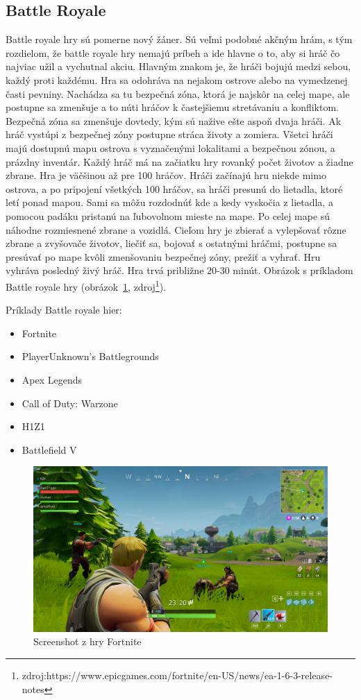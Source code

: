 \documentclass[10pt,oneside,slovak,a4paper]{article}
\begin{document}
\subsection{Battle Royale} \label{zanre:battleroyale}

Battle royale hry sú pomerne nový žáner. Sú veľmi podobné akčným hrám, s tým rozdielom, že battle royale hry nemajú príbeh a ide hlavne o to, aby si hráč čo najviac užil a vychutnal akciu. Hlavným znakom je, že hráči bojujú medzi sebou, každý proti každému. Hra sa odohráva na nejakom ostrove alebo na vymedzenej časti pevniny. Nachádza sa tu bezpečná zóna, ktorá je najskôr na celej mape, ale postupne sa zmenšuje a to núti hráčov k častejšiemu stretávaniu a konfliktom. Bezpečná zóna sa zmenšuje dovtedy, kým sú nažive ešte aspoň dvaja hráči. Ak hráč vystúpi z bezpečnej zóny postupne stráca životy a zomiera. Všetci hráči majú dostupnú mapu ostrova s vyznačenými lokalitami a bezpečnou zónou, a prázdny inventár. Každý hráč má na začiatku hry rovanký počet životov a žiadne zbrane. Hra je väčšinou až pre 100 hráčov. Hráči začínajú hru niekde mimo ostrova, a po pripojení všetkých 100 hráčov, sa hráči presunú do lietadla, ktoré letí ponad mapou. Sami sa môžu rozdodnúť kde a kedy vyskočia z lietadla, a pomocou padáku pristanú na ľubovolnom mieste na mape. Po celej mape sú náhodne rozmiesnené zbrane a vozidlá. Cieľom hry je zbierať a vylepšovať rôzne zbrane a zvyšovače životov, liečiť sa, bojovať s ostatnými hráčmi, postupne sa presúvať po mape kvôli zmenšovaniu bezpečnej zóny, prežiť a vyhrať. Hru vyhráva posledný živý hráč. Hra trvá približne 20-30 minút. Obrázok s príkladom Battle royale hry (obrázok~\ref{f:fortnite}, zdroj\footnote{zdroj:https://www.epicgames.com/fortnite/en-US/news/ea-1-6-3-release-notes}).

Príklady Battle royale hier:
\begin{itemize}
\item Fortnite
\item PlayerUnknown's Battlegrounds
\item Apex Legends
\item Call of Duty: Warzone
\item H1Z1
\item Battlefield V
\end{itemize}

\begin{figure}[h]
\centering
\includegraphics[scale=0.10]{fortnite.jpg}
\caption{Screenshot z hry Fortnite}
\label{f:fortnite}
\end{figure}
\end{document}
